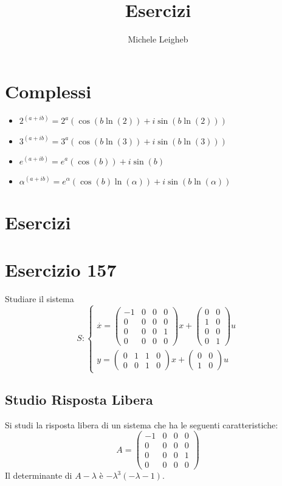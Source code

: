 \documentclass{article}
\title{Esercizi}
\author{Michele Leigheb}
\date{}
\begin{document}
\maketitle
\tableofcontents{}
\section{Complessi}
\begin{itemize}
	\item \(\displaystyle 2^{(a+ib)} = 2^a (\cos(b \ln(2)) + i\sin(b \ln(2))) \)
	\item \(\displaystyle 3^{(a+ib)} = 3^a (\cos(b \ln(3)) + i\sin(b \ln(3))) \)
	\item \(\displaystyle e^{(a+ib)} = e^a (\cos(b)) + i\sin(b) \)
	\item \(\displaystyle \alpha^{(a+ib)} = e^{\alpha} (\cos(b)\ln(\alpha)) + i\sin(b\ln(\alpha)) \)
\end{itemize}



\section{Esercizi}

\section{Esercizio 157 }
 Studiare il sistema \[S:\begin{cases}\overset{\cdot}{x} = \left(\begin{matrix}-1 & 0 & 0 & 0\\0 & 0 & 0 & 0\\0 & 0 & 0 & 1\\0 & 0 & 0 & 0\end{matrix}\right) x+ \left(\begin{matrix}0 & 0\\1 & 0\\0 & 0\\0 & 1\end{matrix}\right)u\\y = \left(\begin{matrix}0 & 1 & 1 & 0\\0 & 0 & 1 & 0\end{matrix}\right) x +\left(\begin{matrix}0 & 0\\1 & 0\end{matrix}\right) u\end{cases}\]\subsection{Studio Risposta Libera}
Si studi la risposta libera di un sistema che ha le seguenti caratteristiche: \[A = \left(\begin{matrix}-1 & 0 & 0 & 0\\0 & 0 & 0 & 0\\0 & 0 & 0 & 1\\0 & 0 & 0 & 0\end{matrix}\right)\]
Il determinante di $A-\lambda$ è $ - \lambda^{3} \left(- \lambda - 1\right) $.
\end{document}
